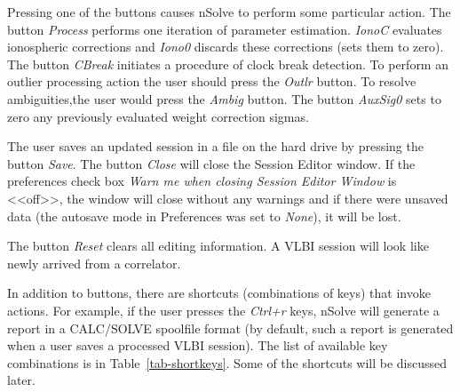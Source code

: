 \documentclass [10pt,letterpaper]{report}
\newcommand{\nuSolve}{\greektext n\latintext Solve}
\begin{document}
Pressing one of the buttons causes \nuSolve{} to perform some particular
action. The button {\sl Process} performs one iteration of parameter
estimation. {\sl IonoC} evaluates ionospheric corrections and {\sl
Iono0} discards these corrections (sets them to zero). The button {\sl
CBreak} initiates a procedure of clock break detection. To perform an
outlier processing action the user should press the {\sl Outlr}
button. To resolve ambiguities,the user would press the {\sl Ambig}
button. The button {\sl AuxSig0} sets to zero any previously evaluated
weight correction sigmas.

The user saves an updated session in a file on the hard drive by
pressing the button {\sl Save}. The button {\sl Close} will close
the Session Editor window. If the preferences check box {\sl Warn me
when closing Session Editor Window} is <<off>>, the window will close
without any warnings and if there were unsaved data (the autosave mode
in Preferences was set to {\sl None}), it will be lost.

The button {\sl Reset} clears all editing information. A VLBI session
will look like newly arrived from a correlator.

In addition to buttons, there are shortcuts (combinations of keys) that
invoke actions. For example, if the user presses the {\sl Ctrl+r} keys,
\nuSolve{} will generate a report in a CALC/SOLVE spoolfile format (by
default, such a report is generated when a user saves a processed VLBI
session). The list of available key combinations is in Table~\ref{tab-shortkeys}.
Some of the shortcuts will be discussed later.
\end{document}
